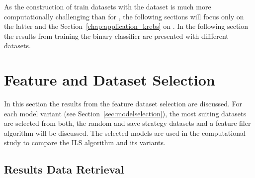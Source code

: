 \parbreak

As the construction of train datasets with the \krebsADataSetText dataset is much more computationally challenging than for \gendreauDataSet,
the following sections will focus only on the latter and the Section~\ref{chap:application_krebs} on \krebsADataSet.
In the following section the results from training the binary classifier are presented with diffferent datasets.

\section{Feature and Dataset Selection}
\label{sec:ResultsTraining}
In this section the results from the feature dataset selection are discussed. For each model variant (see Section~\ref{sec:modelselection}),
the most suiting datasets are selected from both, the random and save strategy datasets and
a feature filer algorithm will be discussed. The selected models are used in the computational study to compare the \gls{ILS} algorithm
and its variants.

\subsection{Results Data Retrieval}
\label{subsec:results_retrieval}

